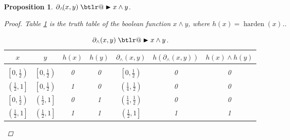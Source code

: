 \documentclass{article}
\makeatletter
\theoremstyle{plain}
\newtheorem{proposition}[theorem]{Proposition}
\theoremstyle{definition}
\theoremstyle{remark}
\DeclareRobustCommand{\btright}{\mathrel{\mathpalette\btlr@\blacktriangleright}}
\newcommand{\btlr@}[2]{%
	\begingroup
	\sbox\z@{$\m@th#1\triangleright$}%
	\sbox\tw@{\resizebox{1.1\wd\z@}{1.1\ht\z@}{\raisebox{\depth}{$\m@th#1\mkern-1mu#2$}}}%
	\ht\tw@=\ht\z@ \dp\tw@=\dp\z@ \wd\tw@=\wd\z@
	\copy\tw@
	\endgroup
}
\makeatother
\begin{document}
\begin{proposition}\label{prop:and}
	$\partial_{\wedge}\!(x,y) \btright x \wedge y$.
	\begin{proof}
		Table \ref{and-table} is the truth table of the boolean function $x \wedge y$, where $h(x) = \operatorname{harden}(x)$..
		\begin{table}[h!]
			\begin{center}
				\begin{tabular}{ccccccc}
					\multicolumn{1}{c}{$x$}  &\multicolumn{1}{c}{$y$}  &\multicolumn{1}{c}{$h(x)$}  &\multicolumn{1}{c}{$h(y)$} &\multicolumn{1}{c}{$\partial_{\wedge}(x, y)$} &\multicolumn{1}{c}{$h(\partial_{\wedge}(x, y))$}
					&\multicolumn{1}{c}{$h(x) \wedge h(y)$}
					\\ \hline \\
					$\left[0, \frac{1}{2}\right)$ & $\left[0, \frac{1}{2}\right)$ & 0 & 0 & $\left[0, \frac{1}{2}\right)$ & 0 & 0\\[0.1cm]
					$\left(\frac{1}{2}, 1\right]$ & $\left[0, \frac{1}{2}\right)$ &1 & 0 & $\left(\frac{1}{4}, \frac{1}{2}\right)$ & 0 & 0\\[0.1cm]
					$\left[0, \frac{1}{2}\right)$ & $\left(\frac{1}{2}, 1\right]$ &0 & 1 & $\left(\frac{1}{4}, \frac{1}{2}\right)$ & 0 & 0\\[0.1cm]
					$\left(\frac{1}{2}, 1\right]$ & $\left(\frac{1}{2}, 1\right]$ &1 & 1 & $\left(\frac{1}{2}, 1\right]$ & 1 & 1\\[0.1cm]
				\end{tabular}
			\end{center}
			\caption{$\partial_{\wedge}(x,y) \btright x \wedge y$.}\label{and-table}
		\end{table}			
	\end{proof}
\end{proposition}
\end{document}
